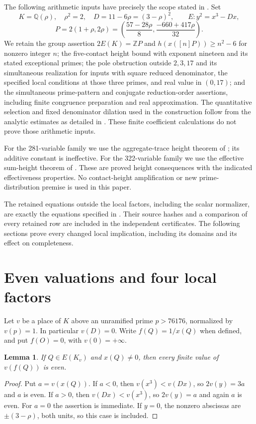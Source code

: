 \documentclass[11pt,a4paper]{article}
\newtheorem{lemma}[theorem]{Lemma}
\theoremstyle{remark}\newtheorem{remark}[theorem]{Remark}
\newcommand{\Q}{\mathbb Q}\newcommand{\Z}{\mathbb Z}\newcommand{\HH}{\mathcal H}
\begin{document}
The following arithmetic inputs have precisely the scope stated in
\cite{Dependencies,Shared,Explicit}. Set
\[
 K=\Q(\rho),\quad \rho^2=2,\quad D=11-6\rho=(3-\rho)^2,
 \qquad E:y^2=x^3-Dx,
\]
\[
 P=2(1+\rho,2\rho)
  =\left(\frac{57-28\rho}{8},\frac{-660+417\rho}{32}\right).
\]
We retain the group assertion $2E(K)=\Z P$ and
$h(x([n]P))\ge n^2-6$ for nonzero integer $n$; the five-contact
height bound with exponent nineteen and its stated exceptional primes;
the pole obstruction outside $2,3,17$ and its simultaneous realization
for inputs with square reduced denominator, the specified local
conditions at those three primes, and real value in $(0,17)$; and the
simultaneous prime-pattern and conjugate reduction-order assertions,
including finite congruence preparation and real approximation.
The quantitative selection and fixed denominator dilation used in the
construction follow from the analytic estimates as detailed in
\cite{Selection}. These finite coefficient calculations do not prove
those arithmetic inputs.

For the 281-variable family we use the aggregate-trace height theorem
of \cite{Aggregate}; its additive constant is ineffective. For the
322-variable family we use the effective sum-height theorem of
\cite{Sums}. These are proved height consequences with the indicated
effectiveness properties. No contact-height amplification or new
prime-distribution premise is used in this paper.

The retained equations outside the local factors, including the scalar
normalizer, are exactly the equations specified in
\cite{Shared,Existence,Explicit}. Their source hashes and a comparison
of every retained row are included in the independent certificates.
The following sections prove every changed local implication, including
its domains and its effect on completeness.

\section{Even valuations and four local factors}
Let $v$ be a place of $K$ above an unramified prime $p>76176$,
normalized by $v(p)=1$. In particular $v(D)=0$. Write $f(Q)=1/x(Q)$
when defined, and put $f(O)=0$, with $v(0)=+\infty$.

\begin{lemma}\label{lem:even}
If $Q\in E(K_v)$ and $x(Q)\ne0$, then every finite value of
$v(f(Q))$ is even.
\end{lemma}
\begin{proof}
Put $a=v(x(Q))$. If $a<0$, then $v(x^3)<v(Dx)$, so
$2v(y)=3a$ and $a$ is even. If $a>0$, then
$v(Dx)<v(x^3)$, so $2v(y)=a$ and again $a$ is even.
For $a=0$ the assertion is immediate. If $y=0$, the nonzero abscissas
are $\pm(3-\rho)$, both units, so this case is included.
\end{proof}
\end{document}
